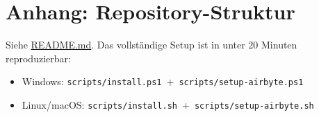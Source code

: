 \documentclass[a4paper,12pt]{article}
\begin{document}
\section{Anhang: Repository-Struktur}
 
Siehe
\href{https://github.com/Timbo3399/INFM_Airbyte/blob/main/README.md}{README.md}.
Das vollständige Setup ist in unter 20 Minuten reproduzierbar:
\begin{itemize}[noitemsep, leftmargin=*]
    \item Windows: \texttt{scripts/install.ps1}~+~\texttt{scripts/setup-airbyte.ps1}
    \item Linux/macOS: \texttt{scripts/install.sh}~+~\texttt{scripts/setup-airbyte.sh}
\end{itemize}
 
\end{document}
